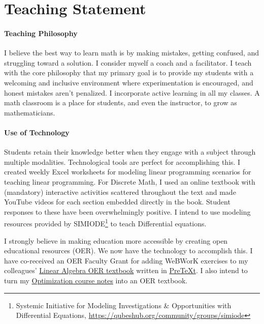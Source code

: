 \documentclass[
]{report}
\begin{document}
\hypertarget{teaching-statement}{%
\chapter{Teaching Statement}\label{teaching-statement}}

\hypertarget{teaching-philosophy}{%
\subsubsection*{Teaching Philosophy}\label{teaching-philosophy}}


I believe the best way to learn math is by making mistakes, getting confused, and struggling toward a solution. I consider myself a coach and a facilitator. I teach with the core philosophy that my primary goal is to provide my students with a welcoming and inclusive environment where experimentation is encouraged, and honest mistakes aren't penalized. I incorporate active learning in all my classes. A math classroom is a place for students, and even the instructor, to grow as mathematicians.

\hypertarget{use-of-technology}{%
\subsubsection*{Use of Technology}\label{use-of-technology}}


Students retain their knowledge better when they engage with a subject through multiple modalities. Technological tools are perfect for accomplishing this.
I created weekly Excel worksheets for modeling linear programming scenarios for teaching linear programming. For Discrete Math, I used an online textbook with (mandatory) interactive activities scattered throughout the text and made YouTube videos for each section embedded directly in the book. Student responses to these have been overwhelmingly positive.
I intend to use modeling resources provided by SIMIODE\footnote{Systemic Initiative for Modeling Investigations \& Opportunities with Differential Equations, \url{https://qubeshub.org/community/groups/simiode}} to teach Differential equations.

I strongly believe in making education more accessible by creating open educational resources (OER).
We now have the technology to accomplish this.
I have co-received an OER Faculty Grant for adding WeBWorK exercises to my colleagues' \href{http://linear-algebra.northwestern.pub/frontmatter-1.html}{Linear Algebra OER textbook} written in \href{https://pretextbook.org/}{PreTeXt}. I also intend to turn my \href{https://apurvanakade.github.io/Introduction-to-Optimization/}{Optimization course notes} into an OER textbook.
\end{document}
